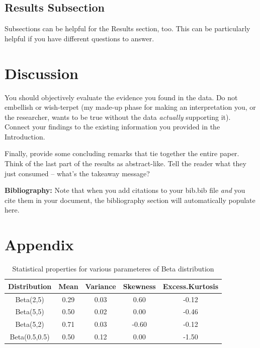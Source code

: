 \documentclass{article}\usepackage[]{graphicx}\usepackage[]{xcolor}
\begin{document}
\begin{multicols}{2}
\subsection{Results Subsection}
Subsections can be helpful for the Results section, too. This can be particularly helpful if you have different questions to answer. 


\section{Discussion}
 You should objectively evaluate the evidence you found in the data. Do not embellish or wish-terpet (my made-up phase for making an interpretation you, or the researcher, wants to be true without the data \emph{actually} supporting it). Connect your findings to the existing information you provided in the Introduction.

Finally, provide some concluding remarks that tie together the entire paper. Think of the last part of the results as abstract-like. Tell the reader what they just consumed -- what's the takeaway message?

\vspace{2em}

\noindent\textbf{Bibliography:} Note that when you add citations to your bib.bib file \emph{and}
you cite them in your document, the bibliography section will automatically populate here.

\begin{tiny}

\end{tiny}
\end{multicols}

\newpage
\onecolumn
\section{Appendix}

\begin{table}[ht]
\centering
\begin{tabular}{|c|c|c|c|c|}
  \hline
Distribution & Mean & Variance & Skewness & Excess.Kurtosis \\ 
  \hline
Beta(2,5) & 0.29 & 0.03 & 0.60 & -0.12 \\ 
  Beta(5,5) & 0.50 & 0.02 & 0.00 & -0.46 \\ 
  Beta(5,2) & 0.71 & 0.03 & -0.60 & -0.12 \\ 
  Beta(0.5,0.5) & 0.50 & 0.12 & 0.00 & -1.50 \\ 
   \hline
\end{tabular}
\caption{Statistical properties for various parameteres of Beta distribution} 
\label{statsProperties.tab}
\end{table}
\end{document}
